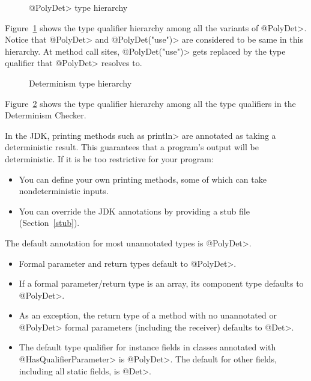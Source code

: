\begin{figure}
    \begin{center}
    \end{center}
    \caption{\<@PolyDet> type hierarchy}
    \label{fig-determinism-poly-hierarchy}
\end{figure}
Figure~\ref{fig-determinism-poly-hierarchy} shows the type qualifier hierarchy among all the
variants of \<@PolyDet>. Notice that \<@PolyDet> and \<@PolyDet("use")> are considered
to be same in this hierarchy.
At method call sites, \<@PolyDet("use")> gets replaced by the type qualifier that \<@PolyDet>
resolves to.

\begin{figure}
    \begin{center}
    \end{center}
    \caption{Determinism type hierarchy}
    \label{fig-determinism-all-hierarchy}
\end{figure}
Figure~\ref{fig-determinism-all-hierarchy} shows the type qualifier hierarchy among all the
type qualifiers in the Determinism Checker.


In the JDK, printing methods such as \<println> are annotated as taking a
deterministic result.  This guarantees that a program's output will be
deterministic.  If it is be too restrictive for your program:
\begin{itemize}
\item
  You can define your own printing methods, some of which can take
  nondeterministic inputs.
\item
  You can override the JDK annotations by providing a stub file
  (Section~\ref{stub}).
\end{itemize}



The default annotation for most unannotated types is \<@PolyDet>.

\begin{itemize}
\item
  Formal parameter and return types default to \<@PolyDet>.
\item
  If a formal parameter/return type is an array, its component type defaults to
  \<@PolyDet>.
\item
  As an exception, the return type of a method with no unannotated or
  \<@PolyDet> formal parameters (including the receiver) defaults to
  \<@Det>.
\item
  The default type qualifier for instance fields in classes annotated with
  \<@HasQualifierParameter> is \<@PolyDet>. The default for other fields,
  including all static fields, is \<@Det>.
\end{itemize}

